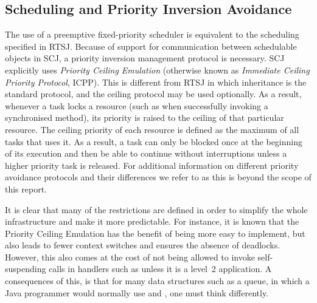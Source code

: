 \subsection{Scheduling and Priority Inversion Avoidance} %
\label{sub:scheduling_and_priority_inversion_avoidance}
The use of a preemptive fixed-priority scheduler is equivalent to the scheduling specified in RTSJ. Because of support for communication between schedulable objects in SCJ, a priority inversion management protocol is necessary. SCJ explicitly uses \textit{Priority Ceiling Emulation} (otherwise known as \textit{Immediate Ceiling Priority Protocol}, ICPP). This is different from RTSJ in which inheritance is the standard protocol, and the ceiling protocol may be used optionally. As a result, whenever a task locks a resource (such as when successfully invoking a synchronised method), its priority is raised to the ceiling of that particular resource. The ceiling priority of each resource is defined as the maximum of all tasks that uses it. As a result, a task can only be blocked once at the beginning of its execution and then be able to continue without interruptions unless a higher priority task is released. For additional information on different priority avoidance protocols and their differences we refer to \cite{alan2001real} as this is beyond the scope of this report.

It is clear that many of the restrictions are defined in order to simplify the whole infrastructure and make it more predictable. For instance, it is known that the Priority Ceiling Emulation has the benefit of being more easy to implement, but also leads to fewer context switches and ensures the absence of deadlocks\cite{alan2001real}. However, this also comes at the cost of not being allowed to invoke self-suspending calls in handlers such as  unless it is a level~2 application. A consequences of this, is that for many data structures such as a queue, in which a Java programmer would normally use  and , one must think differently.


